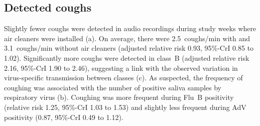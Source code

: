 \documentclass[fleqn,11pt]{wlscirep}
\begin{document}
\subsection{Detected coughs}

Slightly fewer coughs were detected in audio recordings during study weeks where air cleaners were installed (a). On average, there were 2.5~coughs/min with and 3.1~coughs/min without air cleaners (adjusted relative risk 0.93, 95\%-CrI 0.85 to 1.02). Significantly more coughs were detected in class~B (adjusted relative risk 2.16, 95\%-CrI 1.90 to 2.46), suggesting a link with the observed variation in virus-specific transmission between classes (c). As suspected, the frequency of coughing was associated with the number of positive saliva samples by respiratory virus (b). Coughing was more frequent during Flu~B positivity (relative risk 1.25, 95\%-CrI 1.03 to 1.53) and slightly less frequent during AdV positivity (0.87, 95\%-CrI 0.49 to 1.12). 
\end{document}
